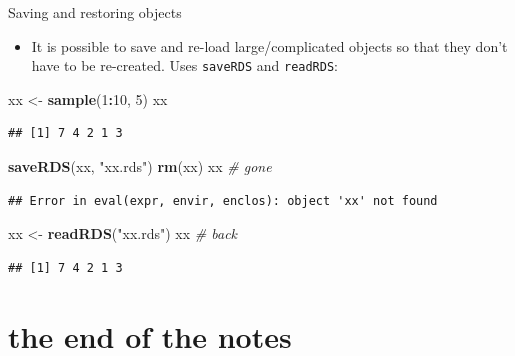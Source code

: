 \documentclass[ignorenonframetext,]{beamer}
\newenvironment{Shaded}{\begin{snugshade}}{\end{snugshade}}
\newcommand{\CommentTok}[1]{\textcolor[rgb]{0.56,0.35,0.01}{\textit{#1}}}
\newcommand{\DecValTok}[1]{\textcolor[rgb]{0.00,0.00,0.81}{#1}}
\newcommand{\KeywordTok}[1]{\textcolor[rgb]{0.13,0.29,0.53}{\textbf{#1}}}
\newcommand{\NormalTok}[1]{#1}
\newcommand{\OperatorTok}[1]{\textcolor[rgb]{0.81,0.36,0.00}{\textbf{#1}}}
\newcommand{\StringTok}[1]{\textcolor[rgb]{0.31,0.60,0.02}{#1}}
\providecommand{\tightlist}{%
  \setlength{\itemsep}{0pt}\setlength{\parskip}{0pt}}
\begin{document}
\begin{frame}[fragile]{Saving and restoring objects}
\protect\hypertarget{saving-and-restoring-objects}{}

\begin{itemize}
\tightlist
\item
  It is possible to save and re-load large/complicated objects so that
  they don't have to be re-created. Uses \texttt{saveRDS} and
  \texttt{readRDS}:
\end{itemize}

\begin{Shaded}
\begin{Highlighting}[]
\NormalTok{xx <-}\StringTok{ }\KeywordTok{sample}\NormalTok{(}\DecValTok{1}\OperatorTok{:}\DecValTok{10}\NormalTok{, }\DecValTok{5}\NormalTok{)}
\NormalTok{xx}
\end{Highlighting}
\end{Shaded}

\begin{verbatim}
## [1] 7 4 2 1 3
\end{verbatim}

\begin{Shaded}
\begin{Highlighting}[]
\KeywordTok{saveRDS}\NormalTok{(xx, }\StringTok{"xx.rds"}\NormalTok{)}
\KeywordTok{rm}\NormalTok{(xx)}
\NormalTok{xx }\CommentTok{# gone}
\end{Highlighting}
\end{Shaded}

\begin{verbatim}
## Error in eval(expr, envir, enclos): object 'xx' not found
\end{verbatim}

\begin{Shaded}
\begin{Highlighting}[]
\NormalTok{xx <-}\StringTok{ }\KeywordTok{readRDS}\NormalTok{(}\StringTok{"xx.rds"}\NormalTok{)}
\NormalTok{xx }\CommentTok{# back}
\end{Highlighting}
\end{Shaded}

\begin{verbatim}
## [1] 7 4 2 1 3
\end{verbatim}

\end{frame}

\hypertarget{the-end-of-the-notes}{%
\section{the end of the notes}\label{the-end-of-the-notes}}
\end{document}
